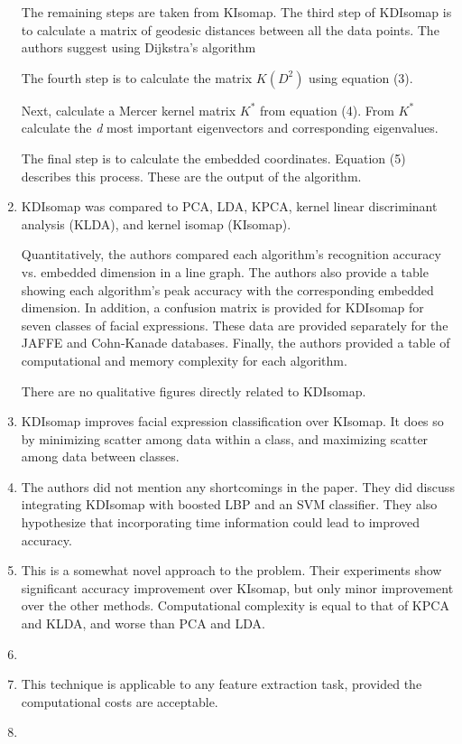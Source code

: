 \documentclass[11pt]{article}
\begin{document}
\begin{enumerate}
        The remaining steps are taken from KIsomap. The third step of KDIsomap
        is to calculate a matrix of geodesic distances between all the data
        points. The authors suggest using Dijkstra's algorithm

        The fourth step is to calculate the matrix \(K(D^2)\) using equation
        (3).

        Next, calculate a Mercer kernel matrix \(K^*\) from equation (4). From
        \(K^*\) calculate the \emph{d} most important eigenvectors and
        corresponding eigenvalues.

        The final step is to calculate the embedded coordinates. Equation (5)
        describes this process. These are the output of the algorithm.

    \item KDIsomap was compared to PCA, LDA, KPCA, kernel linear discriminant
        analysis (KLDA), and kernel isomap (KIsomap).

        Quantitatively, the authors compared each algorithm's recognition
        accuracy vs. embedded dimension in a line graph. The authors also
        provide a table showing each algorithm's peak accuracy with the
        corresponding embedded dimension. In addition, a confusion matrix is
        provided for KDIsomap for seven classes of facial expressions. These
        data are provided separately for the JAFFE and Cohn-Kanade databases.
        Finally, the authors provided a table of computational and memory
        complexity for each algorithm.

        There are no qualitative figures directly related to KDIsomap.

    \item KDIsomap improves facial expression classification over KIsomap. It
        does so by minimizing scatter among data within a class, and maximizing
        scatter among data between classes.

    \item The authors did not mention any shortcomings in the paper. They did
        discuss integrating KDIsomap with boosted LBP and an SVM classifier.
        They also hypothesize that incorporating time information could lead to
        improved accuracy.

    \item This is a somewhat novel approach to the problem. Their experiments
        show significant accuracy improvement over KIsomap, but only minor
        improvement over the other methods. Computational complexity is equal to
        that of KPCA and KLDA, and worse than PCA and LDA.

    \item

    \item This technique is applicable to any feature extraction task, provided
        the computational costs are acceptable.

    \item
\end{enumerate}



\end{document}

